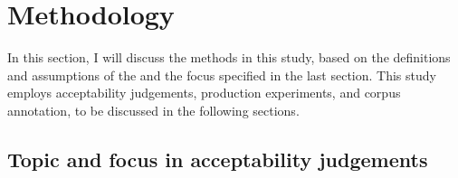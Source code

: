 

%
%

\section{Methodology}\label{FrameworkTFIdent}

In this section,
I will discuss the methods in this study,
based on the definitions and assumptions of the  and the focus specified in the last section.
This study employs acceptability judgements,
production experiments, and
corpus annotation,
to be discussed in the following sections.

\subsection{Topic and focus in acceptability judgements}

